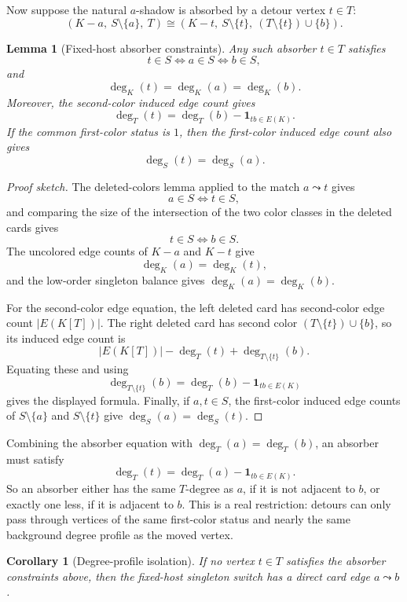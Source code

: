 \documentclass[11pt]{article}
\newtheorem{lemma}{Lemma}
\newtheorem{corollary}{Corollary}
\newcommand{\one}{\mathbf{1}}
\begin{document}
Now suppose the natural \(a\)-shadow is absorbed by a detour vertex
\(t\in T\):
\[
  (K-a,\ S\setminus\{a\},\ T)
  \cong
  (K-t,\ S\setminus\{t\},\ (T\setminus\{t\})\cup\{b\}).
\]

\begin{lemma}[Fixed-host absorber constraints]
Any such absorber \(t\in T\) satisfies
\[
  t\in S \Longleftrightarrow a\in S \Longleftrightarrow b\in S,
\]
and
\[
  \deg_K(t)=\deg_K(a)=\deg_K(b).
\]
Moreover, the second-color induced edge count gives
\[
  \deg_T(t)=\deg_T(b)-\one_{tb\in E(K)}.
\]
If the common first-color status is \(1\), then the first-color induced edge
count also gives
\[
  \deg_S(t)=\deg_S(a).
\]
\end{lemma}

\begin{proof}[Proof sketch]
The deleted-colors lemma applied to the match \(a\leadsto t\) gives
\[
  a\in S \Longleftrightarrow t\in S,
\]
and comparing the size of the intersection of the two color classes in the
deleted cards gives
\[
  t\in S \Longleftrightarrow b\in S.
\]
The uncolored edge counts of \(K-a\) and \(K-t\) give
\[
  \deg_K(a)=\deg_K(t),
\]
and the low-order singleton balance gives \(\deg_K(a)=\deg_K(b)\).

For the second-color edge equation, the left deleted card has second-color
edge count \(|E(K[T])|\).  The right deleted card has second color
\((T\setminus\{t\})\cup\{b\}\), so its induced edge count is
\[
  |E(K[T])|-\deg_T(t)+\deg_{T\setminus\{t\}}(b).
\]
Equating these and using
\[
  \deg_{T\setminus\{t\}}(b)=\deg_T(b)-\one_{tb\in E(K)}
\]
gives the displayed formula.  Finally, if \(a,t\in S\), the first-color
induced edge counts of \(S\setminus\{a\}\) and \(S\setminus\{t\}\) give
\(\deg_S(a)=\deg_S(t)\).
\end{proof}

Combining the absorber equation with \(\deg_T(a)=\deg_T(b)\), an absorber
must satisfy
\[
  \deg_T(t)=\deg_T(a)-\one_{tb\in E(K)}.
\]
So an absorber either has the same \(T\)-degree as \(a\), if it is not
adjacent to \(b\), or exactly one less, if it is adjacent to \(b\).  This is a
real restriction: detours can only pass through vertices of the same
first-color status and nearly the same background degree profile as the moved
vertex.

\begin{corollary}[Degree-profile isolation]
If no vertex \(t\in T\) satisfies the absorber constraints above, then the
fixed-host singleton switch has a direct card edge \(a\leadsto b\).
\end{corollary}
\end{document}
